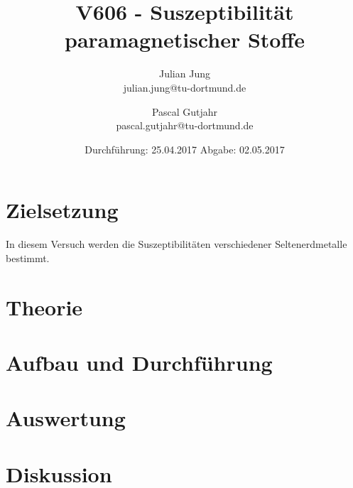 

\title{V606 - Suszeptibilität paramagnetischer Stoffe}
\author{Julian Jung \\ julian.jung@tu-dortmund.de
  \and Pascal Gutjahr \\ pascal.gutjahr@tu-dortmund.de}
  \date{Durchführung: 25.04.2017
  \hspace{3em}
  Abgabe: 02.05.2017}
  
\maketitle
\newpage
\tableofcontents
\newpage
\section{Zielsetzung}
In diesem Versuch werden die Suszeptibilitäten verschiedener Seltenerdmetalle
bestimmt.
\section{Theorie}
 
\section{Aufbau und Durchführung}
 
\section{Auswertung}
 
\section{Diskussion}
% 
\printbibliography


